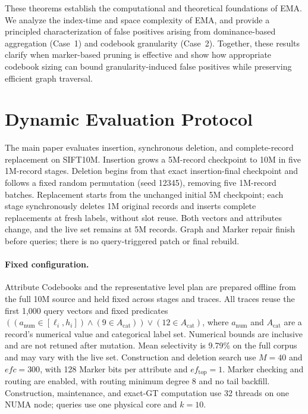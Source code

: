 
These theorems establish the computational and theoretical foundations of EMA. We analyze the index-time and space complexity of EMA, and provide a principled characterization of false positives arising from dominance-based aggregation (Case~1) and codebook granularity (Case~2). Together, these results clarify when marker-based pruning is effective and show how appropriate codebook sizing can bound granularity-induced false positives while preserving efficient graph traversal.


\section{Dynamic Evaluation Protocol}
\label{sec:dynamic-protocol}

The main paper evaluates insertion, synchronous deletion, and complete-record replacement on SIFT10M.
Insertion grows a 5M-record checkpoint to 10M in five 1M-record stages.
Deletion begins from that exact insertion-final checkpoint and follows a fixed random permutation (seed 12345), removing five 1M-record batches.
Replacement starts from the unchanged initial 5M checkpoint; each stage synchronously deletes 1M original records and inserts complete replacements at fresh labels, without slot reuse.
Both vectors and attributes change, and the live set remains at 5M records.
Graph and Marker repair finish before queries; there is no query-triggered patch or final rebuild.

\paragraph{Fixed configuration.}
Attribute Codebooks and the representative level plan are prepared offline from the full 10M source and held fixed across stages and traces.
All traces reuse the first 1,000 query vectors and fixed predicates
$((a_{\mathrm{num}}\in[\ell_i,h_i])\land(9\in A_{\mathrm{cat}}))\lor(12\in A_{\mathrm{cat}})$,
where $a_{\mathrm{num}}$ and $A_{\mathrm{cat}}$ are a record's numerical value and categorical label set.
Numerical bounds are inclusive and are not retuned after mutation.
Mean selectivity is 9.79\% on the full corpus and may vary with the live set.
Construction and deletion search use $M=40$ and $efc=300$, with 128 Marker bits per attribute and $ef_{\mathrm{top}}=1$.
Marker checking and routing are enabled, with routing minimum degree 8 and no tail backfill.
Construction, maintenance, and exact-GT computation use 32 threads on one NUMA node; queries use one physical core and $k=10$.

